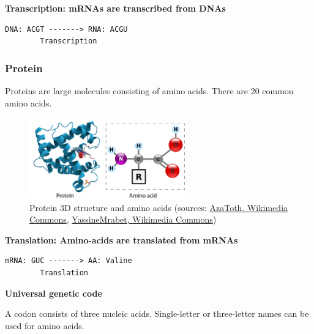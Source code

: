 \noindent \textbf{Transcription: mRNAs are transcribed from DNAs}

\begin{verbatim}
DNA: ACGT -------> RNA: ACGU
        Transcription
\end{verbatim}

%
%
\subsubsection*{Protein}

Proteins are large molecules consisting of amino acids. There are 20 common amino acids.
 
\begin{figure}[H]
  \centering
      \includegraphics[width=0.6\textwidth]{fig01/protein_and_amino_acid.png}
  \caption{Protein 3D structure and amino acids \newline (sources: \href{https://en.wikipedia.org/wiki/Protein\#/media/File:Myoglobin.png}{AzaToth, Wikimedia Commons}, \href{https://en.wikipedia.org/wiki/Amino_acid\#/media/File:AminoAcidball.svg}{YassineMrabet, Wikimedia Commons})}
\end{figure}

\noindent \textbf{Translation: Amino-acids are translated from mRNAs}

\begin{verbatim}
mRNA: GUC -------> AA: Valine
        Translation
\end{verbatim}

%
%
\newpage 

\noindent \textbf{Universal genetic code}

\noindent A codon consists of three nucleic acids. Single-letter or three-letter names can be used for amino acids.

